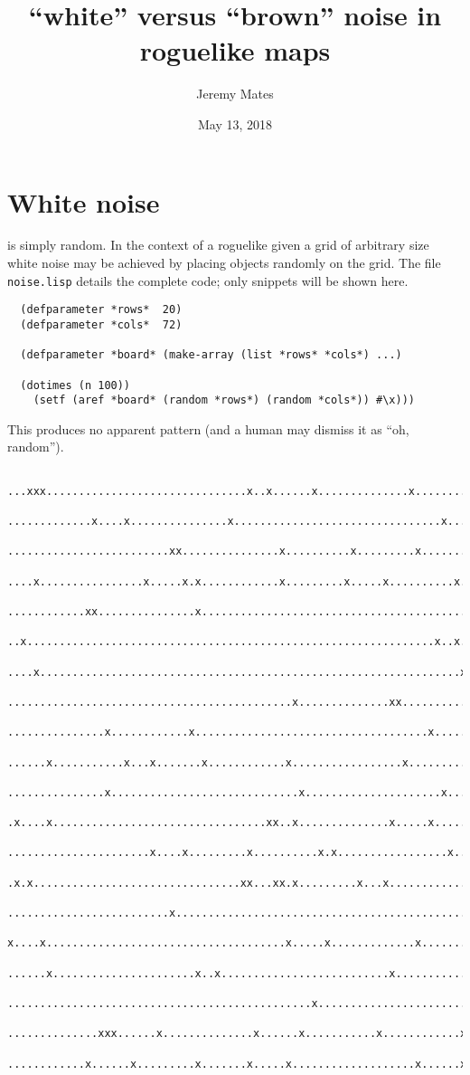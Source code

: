 \documentclass[12pt,a4paper]{article}
\title{``white'' versus ``brown'' noise in roguelike maps}
\author{Jeremy Mates}
\date{May 13, 2018}
\begin{document}

\maketitle

\setlength{\parindent}{0pt}

\section*{White noise}

is simply random\cite{bulmer2000music}. In the context of a roguelike
given a grid of arbitrary size white noise may be achieved by placing
objects randomly on the grid. The file \texttt{noise.lisp} details the
complete code; only snippets will be shown here.

\begin{verbatim}
  (defparameter *rows*  20)
  (defparameter *cols*  72)

  (defparameter *board* (make-array (list *rows* *cols*) ...)

  (dotimes (n 100))
    (setf (aref *board* (random *rows*) (random *cols*)) #\x)))
\end{verbatim}

This produces no apparent pattern (and a human may dismiss it as ``oh,
random'').

\begin{verbatim}
  ...xxx...............................x..x......x..............x.........
  .............x....x...............x................................x....
  .........................xx...............x..........x.........x........
  ....x................x.....x.x............x.........x.....x..........x..
  ............xx...............x..........................................
  ..x...............................................................x..x..
  ....x.................................................................x.
  ............................................x..............xx...........
  ...............x............x....................................x......
  ......x...........x...x.......x............x.................x..........
  ...............x.............................x.....................x....
  .x....x.................................xx..x..............x.....x......
  ......................x....x.........x..........x.x.................x...
  .x.x................................xx...xx.x.........x...x.............
  .........................x..............................................
  x....x.....................................x.....x.............x........
  ......x......................x..x..........................x............
  ...............................................x........................
  ..............xxx......x..............x......x...........x............x.
  ............x......x.........x.......x.....x...................x......x.
\end{verbatim}
\end{document}
